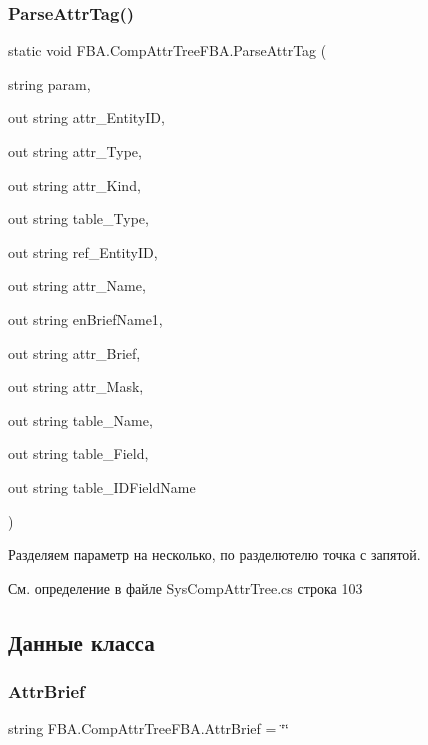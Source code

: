 \subsubsection{\texorpdfstring{Parse\+Attr\+Tag()}{ParseAttrTag()}}
{\footnotesize\ttfamily static void F\+B\+A.\+Comp\+Attr\+Tree\+F\+B\+A.\+Parse\+Attr\+Tag (\begin{DoxyParamCaption}\item[{string}]{param,  }\item[{out string}]{attr\+\_\+\+Entity\+ID,  }\item[{out string}]{attr\+\_\+\+Type,  }\item[{out string}]{attr\+\_\+\+Kind,  }\item[{out string}]{table\+\_\+\+Type,  }\item[{out string}]{ref\+\_\+\+Entity\+ID,  }\item[{out string}]{attr\+\_\+\+Name,  }\item[{out string}]{en\+Brief\+Name1,  }\item[{out string}]{attr\+\_\+\+Brief,  }\item[{out string}]{attr\+\_\+\+Mask,  }\item[{out string}]{table\+\_\+\+Name,  }\item[{out string}]{table\+\_\+\+Field,  }\item[{out string}]{table\+\_\+\+I\+D\+Field\+Name }\end{DoxyParamCaption})\hspace{0.3cm}{\ttfamily [static]}}



Разделяем параметр на несколько, по разделютелю точка с запятой. 



См. определение в файле Sys\+Comp\+Attr\+Tree.\+cs строка 103



\subsection{Данные класса}
\mbox{\label{class_f_b_a_1_1_comp_attr_tree_f_b_a_a7e7b5e30fca4dbcdd634ab40e21d87c0}} 
\subsubsection{\texorpdfstring{Attr\+Brief}{AttrBrief}}
{\footnotesize\ttfamily string F\+B\+A.\+Comp\+Attr\+Tree\+F\+B\+A.\+Attr\+Brief = \char`\"{}\char`\"{}}



